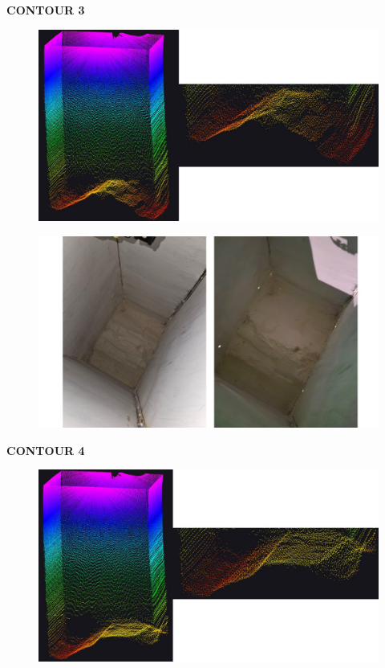 \newpage

\textbf{CONTOUR 3}

\begin{figure}[H]
	\centering
	\includegraphics[width=1\textwidth]{Figures/test3-3}
\end{figure}

\vspace{0.5cm}

\begin{figure}[H]
	\centering
	\includegraphics[width=1\textwidth]{Figures/test3-3-actual}
\end{figure}

\newpage

\textbf{CONTOUR 4}

\begin{figure}[H]
	\centering
	\includegraphics[width=1\textwidth]{Figures/test3-4}
\end{figure}


